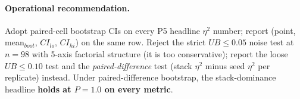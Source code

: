 \paragraph{Operational recommendation.}
Adopt paired-cell bootstrap CIs on every P5 headline $\eta^2$
number; report (point, mean$_{boot}$, $CI_{lo}$, $CI_{hi}$) on the
same row. Reject the strict $UB \leq 0.05$ noise test at
$n{=}98$ with 5-axis factorial structure (it is too conservative);
report the loose $UB \leq 0.10$ test and the \emph{paired-difference}
test (stack $\eta^2$ minus seed $\eta^2$ per replicate) instead.
Under paired-difference bootstrap, the stack-dominance headline
\textbf{holds at $P{=}1.0$ on every metric}.
